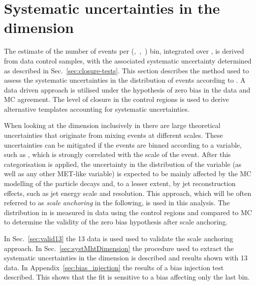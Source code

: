 \section{Systematic uncertainties in the \mht dimension}
\label{sec:syst-on-shape}

The estimate of the number of events per (\njet,~\nb,~\scalht) bin,
integrated over \mht, is derived from data control samples, with
the associated systematic uncertainty determined as 
described in Sec.~\ref{sec:closure-tests}. This section
describes the method used to assess the systematic uncertainties in
the distribution of events according to \mht. A data driven approach is
utilised under the hypothesis of zero bias in the data and MC agreement.
The level of closure in the control regions is used
to derive alternative templates accounting for systematic uncertainties.

When looking at the \mht dimension inclusively in \scalht there are
large theoretical uncertainties that originate from mixing events
at different scales. These uncertainties can be mitigated if the events 
are binned according to a variable, such as \scalht, 
which is strongly correlated with the scale of the event. 
After this categorisation is applied, the uncertainty in 
the distribution of the \mht variable
(as well as any other MET-like variable) is expected to be 
mainly affected by the MC modelling of the particle 
decays and, to a lesser extent, by jet reconstruction effects, 
such as jet energy scale and resolution. 
This approach, which will be often referred to as \textit{scale anchoring}
in the following, is used in this analysis. The distribution in \mht
is measured in data using the control regions and compared to MC
to determine the validity of the zero bias hypothesis after scale anchoring.

In Sec.~\ref{sec:valid13} the 13 \TeV data is used used 
to validate the scale anchoring approach. 
In Sec.~\ref{sec:systMhtDimension} 
the procedure used to extract the systematic uncertainties in the 
\mht dimension is described and results shown with 13 \TeV data. 
In Appendix~\ref{sec:bias_injection} the results of a bias injection test described. 
This shows that the fit is sensitive to a bias affecting only the last \mht bin.



